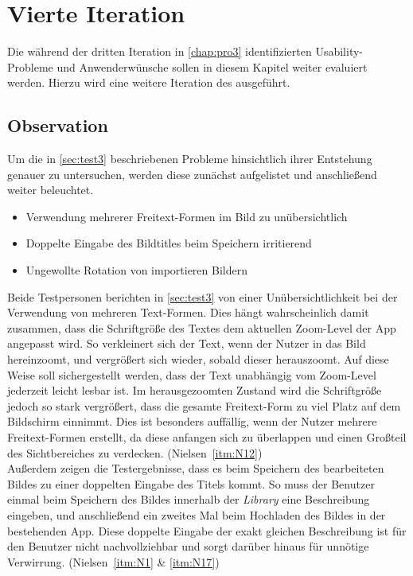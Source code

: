 \chapter{Vierte Iteration}
Die während der dritten Iteration in \autoref{chap:pro3} identifizierten Usability-Probleme und Anwenderwünsche sollen in diesem Kapitel weiter evaluiert werden.
Hierzu wird eine weitere Iteration des \hcdp{} ausgeführt.

\section{Observation}
Um die in \autoref{sec:test3} beschriebenen Probleme hinsichtlich ihrer Entstehung genauer zu untersuchen, werden diese zunächst aufgelistet und anschließend weiter beleuchtet.

\begin{itemize}
  \item Verwendung mehrerer Freitext-Formen im Bild zu unübersichtlich
  \item Doppelte Eingabe des Bildtitles beim Speichern irritierend
  \item Ungewollte Rotation von importieren Bildern
\end{itemize}

\noindent
Beide Testpersonen berichten in \autoref{sec:test3} von einer Unübersichtlichkeit bei der Verwendung von mehreren Text-Formen.
Dies hängt wahrscheinlich damit zusammen, dass die Schriftgröße des Textes dem aktuellen Zoom-Level der App angepasst wird.
So verkleinert sich der Text, wenn der Nutzer in das Bild hereinzoomt, und vergrößert sich wieder, sobald dieser herauszoomt.
Auf diese Weise soll sichergestellt werden, dass der Text unabhängig vom Zoom-Level jederzeit leicht lesbar ist.
Im herausgezoomten Zustand wird die Schriftgröße jedoch so stark vergrößert, dass die gesamte Freitext-Form zu viel Platz auf dem Bildschirm einnimmt.
Dies ist besonders auffällig, wenn der Nutzer mehrere Freitext-Formen erstellt, da diese anfangen sich zu überlappen und einen Großteil des Sichtbereiches zu verdecken.
(Nielsen~\autoref{itm:N12}) \\ 

Außerdem zeigen die Testergebnisse, dass es beim Speichern des bearbeiteten Bildes zu einer doppelten Eingabe des Titels kommt.
So muss der Benutzer einmal beim Speichern des Bildes innerhalb der \emph{Library} eine Beschreibung eingeben, und anschließend ein zweites Mal beim Hochladen des Bildes in der bestehenden App.
Diese doppelte Eingabe der exakt gleichen Beschreibung ist für den Benutzer nicht nachvollziehbar und sorgt darüber hinaus für unnötige Verwirrung.
(Nielsen~\autoref{itm:N1} \& \autoref{itm:N17}) 

